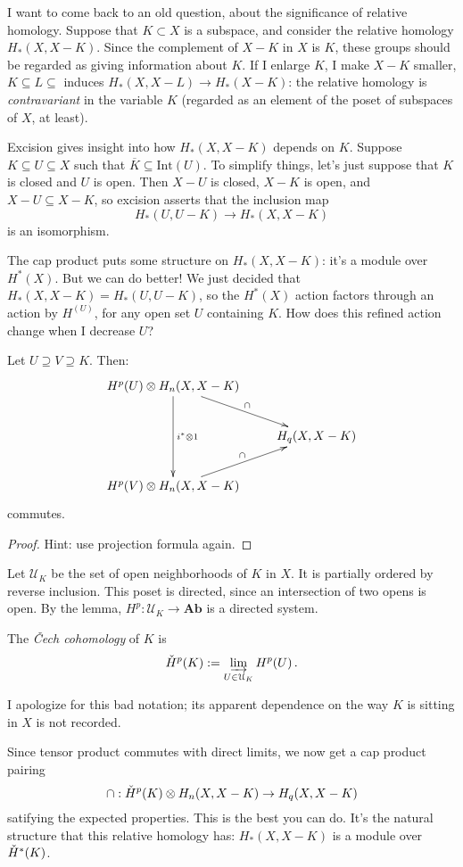 I want to come back to an old question, about the significance of 
relative homology. Suppose that $K\subset X$ is a subspace, and consider the
relative homology $H_*(X,X-K)$. Since the complement of $X-K$ in $X$ is $K$,
these groups should be regarded as giving information about $K$. If I enlarge
$K$, I make $X-K$ smaller, $K\subseteq L\subseteq$ induces
$H_*(X,X-L)\to H_*(X-K)$: the relative homology is {\em contravariant}
in the variable $K$ (regarded as an element of the poset of subspaces of $X$,
at least). 

Excision gives insight into how $H_\ast(X,X-K)$ depends on $K$. 
Suppose $K\subseteq U\subseteq X$ such that $\overline{K}\subseteq\mathrm{Int}(U)$. To simplify things, let's just suppose that $K$ is closed and $U$ is open.
Then $X-U$ is closed, $X-K$ is open, and $X-U\subseteq X-K$, so excision asserts that the inclusion map 
\[
H_*(U,U-K)\to H_*(X,X-K)
\]
is an isomorphism. 

The cap product puts some structure on $H_*(X,X-K)$: it's a module over 
$H^*(X)$. But we can do better! We just decided that $H_*(X,X-K)=H_*(U,U-K)$,
so the $H^*(X)$ action factors through an action by $H^(U)$, for any open 
set $U$ containing $K$. How does this refined action change when I decrease 
$U$?
\begin{lemma}
Let $U\supseteq V\supseteq K$. Then:
\begin{equation*}
\xymatrix{
	 H^p(U)\ar[dd]^{i^\ast\otimes 1}\otimes H_n(X,X-K)\ar[dr]^\cap & \\
	 & H_q(X,X-K)\\
	 H^p(V)\otimes H_n(X,X-K)\ar[ur]^\cap
}
\end{equation*}
commutes.
\end{lemma}
\begin{proof}
Hint: use projection formula again.
\end{proof}
Let $\mathcal{U}_K$ be the set of open neighborhoods of $K$ in $X$. It is partially ordered by reverse inclusion. This poset is directed, since an intersection of two opens is open. By the lemma, $H^p:\mathcal{U}_K\to\mathbf{Ab}$ 
is a directed system. 
\begin{definition}
The {\em \v{C}ech cohomology} of $K$ is
\[
\check{H}^p(K):=\varinjlim_{U\in\mathcal{U}_K} H^p(U)\,.
\]
\end{definition}
I apologize for this bad notation; its apparent dependence on the way $K$ is sitting in $X$ is not recorded. 

Since tensor product commutes with direct limits, we now get a cap product
pairing 
\[
\cap:\check{H}^p(K)\otimes H_n(X,X-K)\to H_q(X,X-K)
\]
satifying the expected properties. 
This is the best you can do. It's the natural structure that this relative homology has: $ H_\ast(X,X-K)$ is a module over $\check{H}^\ast(K)$.

